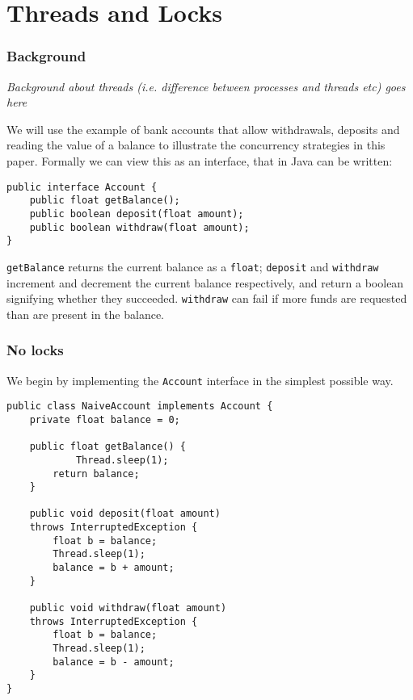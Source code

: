 \documentclass[a4paper,12pt]{kth-mag}
\begin{document}
\part{Threads and Locks}

\section{Background}

\textit{Background about threads (i.e. difference between processes and threads etc) goes here}

We will use the example of bank accounts that allow withdrawals, deposits and reading the value of a balance to illustrate the concurrency strategies in this paper. Formally we can view this as an interface, that in Java can be written:

\begin{listing}[H]
	\begin{verbatim}
public interface Account {
    public float getBalance();
    public boolean deposit(float amount);
    public boolean withdraw(float amount);
}
  	\end{verbatim}
\end{listing}

\texttt{getBalance} returns the current balance as a \texttt{float}; \texttt{deposit} and \texttt{withdraw} increment and decrement the current balance respectively, and return a boolean signifying whether they succeeded. \texttt{withdraw} can fail if more funds are requested than are present in the balance.

\newpage

\section{No locks}

We begin by implementing the \texttt{Account} interface in the simplest possible way.

\begin{listing}[H]
	\begin{verbatim}
public class NaiveAccount implements Account {
    private float balance = 0;

    public float getBalance() {
    		Thread.sleep(1);
        return balance;
    }

    public void deposit(float amount) 
    throws InterruptedException {
        float b = balance;
        Thread.sleep(1);
        balance = b + amount;
    }

    public void withdraw(float amount) 
    throws InterruptedException {
        float b = balance;
        Thread.sleep(1);
        balance = b - amount;
    }
}  
	\end{verbatim}
\end{listing}
\end{document}
